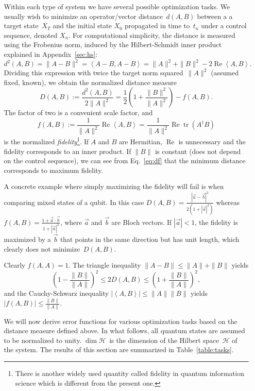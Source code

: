 \documentclass[aps, pra, a4paper, longbibliography, superscriptaddress]{revtex4-1}
\newcommand{\be}{\begin{equation}}
\newcommand{\ee}{\end{equation}}
\newcommand{\inprod}[2]{\left\langle #1, #2 \right\rangle}
\newcommand{\hilb}[1]{\mathcal{#1}}
\DeclareMathOperator{\tr}{tr}
\DeclareMathOperator{\re}{Re}
\newcommand{\Xt}{X_T}  %
\newcommand{\Xo}{X_0}  %
\newcommand{\Xn}{X_n}  %
\begin{document}
Within each type of system we have several possible optimization tasks.
We usually wish to minimize an operator/vector distance~$d(A,B)$ between a
a target state~$\Xt$ and the
initial state $\Xo$ propagated in time to~$t_n$ under a control sequence,
denoted $\Xn$.
For computational simplicity, the distance is measured using the Frobenius
norm, induced by the Hilbert-Schmidt inner product explained in
Appendix~\ref{sec:hs}:
\be
d^2(A, B) = \|A-B\|^2
= \inprod{A-B}{A-B}
= \|A\|^2 +\|B\|^2 -2 \re \inprod{A}{B}.
\ee
Dividing this expression with twice the target norm squared~$\|A\|^2$ (assumed fixed,
known), we obtain the normalized distance measure
\be
\label{eq:df}
D(A,B)
:= \frac{d^2(A, B)}{2\|A\|^2}
= \frac{1}{2}\left(1 +\frac{\|B\|^2}{\|A\|^2}\right) -f(A, B).
\ee
The factor of two is a convenient scale factor, and
\be
f(A, B)
:= \frac{1}{\|A\|^2} \re \inprod{A}{B}
= \frac{1}{\|A\|^2} \re \tr(A^\dagger B)
\ee
is the normalized \emph{fidelity}\footnote{
There is another widely used quantity called fidelity in quantum information science which is different from the present one.}.
If $A$ and $B$ are Hermitian, $\re$ is unnecessary and the fidelity corresponds to an inner product.
If $\|B\|$ is constant (does not depend on the control sequence), we can see from Eq.~\eqref{eq:df} that
the minimum distance corresponds to maximum fidelity.

A concrete example where simply maximizing the fidelity will fail is when comparing mixed states of a qubit.
In this case $D(A,B) = \frac{|\vec{a}-\vec{b}|^2}{2(1+|\vec{a}|^2)}$
whereas $f(A,B) = \frac{1+\vec{a}\cdot\vec{b}}{1+|\vec{a}|^2}$, where
$\vec{a}$ and $\vec{b}$ are Bloch vectors. If $|\vec{a}| < 1$, the
fidelity is maximized by a $\vec{b}$ that points in the same direction
but has unit length, which clearly does not minimize~$D(A,B)$.


Clearly $f(A, A) = 1$.
The triangle inequality $\|A-B\| \le \|A\|+\|B\|$ yields
\be
\left(1 -\frac{\|B\|}{\|A\|} \right)^2 \le 2D(A, B) \le \left(1 +\frac{\|B\|}{\|A\|} \right)^2,
\ee
and the Cauchy-Schwarz inequality $|\inprod{A}{B}| \le \|A\|\|B\|$
yields
$|f(A, B)|
\le \frac{\|B\|}{\|A\|}$.


We will now derive error functions for various optimization tasks
based on the distance measure defined above.
In what follows, all quantum states are assumed to be normalized to
unity. $\dim \hilb{H}$~is the dimension of the Hilbert space~$\hilb{H}$ of the system.
The results of this section are summarized in Table~\ref{table:tasks}.
\end{document}
